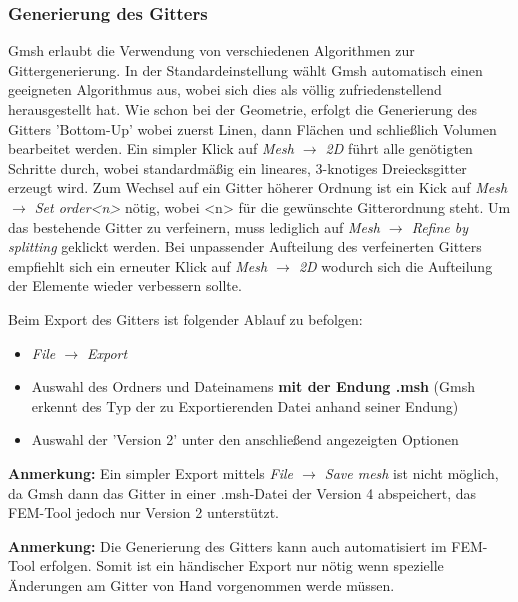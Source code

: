  \subsubsection{Generierung des Gitters}
 Gmsh erlaubt die Verwendung von verschiedenen Algorithmen zur Gittergenerierung. In der Standardeinstellung wählt Gmsh automatisch einen geeigneten Algorithmus aus, wobei sich dies als völlig zufriedenstellend herausgestellt hat. Wie schon bei der Geometrie, erfolgt die Generierung des Gitters 'Bottom-Up' wobei zuerst Linen, dann Flächen und schließlich Volumen bearbeitet werden. Ein simpler Klick auf \textit{Mesh $\rightarrow$ 2D} führt alle genötigten Schritte durch, wobei standardmäßig ein lineares, 3-knotiges Dreiecksgitter erzeugt wird. Zum Wechsel auf ein Gitter höherer Ordnung ist ein Kick auf \textit{Mesh $\rightarrow$ Set order<n>} nötig, wobei <n> für die gewünschte Gitterordnung steht. Um das bestehende Gitter zu verfeinern, muss lediglich auf \textit{Mesh $\rightarrow$ Refine by splitting} geklickt werden. Bei unpassender Aufteilung des verfeinerten Gitters empfiehlt sich ein erneuter Klick auf \textit{Mesh $\rightarrow$ 2D} wodurch sich die Aufteilung der Elemente wieder verbessern sollte.\newline
 
 Beim Export des Gitters ist folgender Ablauf zu befolgen:
 \begin{itemize}
 	\item \textit{File $\rightarrow$ Export}
 	\item Auswahl des Ordners und Dateinamens \textbf{mit der Endung .msh} (Gmsh erkennt des Typ der zu Exportierenden Datei anhand seiner Endung)
 	\item Auswahl der 'Version 2' unter den anschließend angezeigten Optionen
 \end{itemize}

\textbf{Anmerkung:} Ein simpler Export mittels \textit{File $\rightarrow$ Save mesh} ist nicht möglich, da Gmsh dann das Gitter in einer .msh-Datei der Version 4 abspeichert, das FEM-Tool jedoch nur Version 2 unterstützt.\newline

\textbf{Anmerkung:} Die Generierung des Gitters kann auch automatisiert im FEM-Tool erfolgen. Somit ist ein händischer Export nur nötig wenn spezielle Änderungen am Gitter von Hand vorgenommen werde müssen.